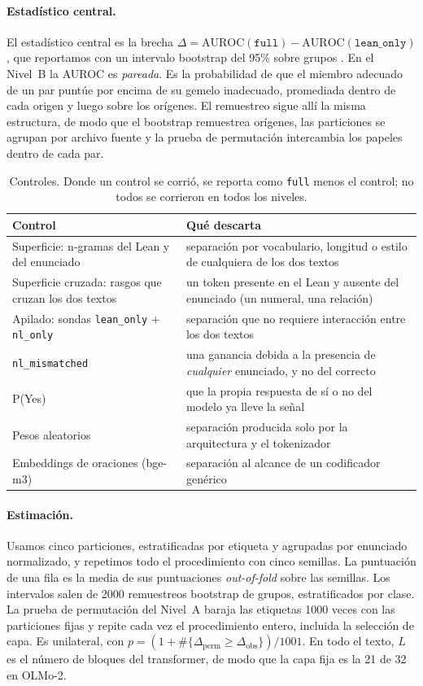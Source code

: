 \documentclass[10pt]{article}
\newcommand{\vr}[1]{\texttt{#1}}
\newcommand{\D}{\Delta}
\begin{document}
\paragraph{Estadístico central.}
El estadístico central es la brecha
$\D = \mathrm{AUROC}(\vr{full}) - \mathrm{AUROC}(\vr{lean\_only})$, que reportamos con un intervalo bootstrap del 95\% sobre grupos \citep{efron}.
En el Nivel~B la AUROC es \emph{pareada}. Es la probabilidad de que el miembro adecuado de un par puntúe por encima
de su gemelo inadecuado, promediada dentro de cada origen y luego sobre los orígenes. El remuestreo sigue allí la
misma estructura, de modo que el bootstrap remuestrea orígenes, las particiones se agrupan por archivo fuente y la
prueba de permutación intercambia los papeles dentro de cada par.

\begin{table}[h]
\centering
\caption{Controles. Donde un control se corrió, se reporta como \vr{full} menos el control; no todos se corrieron en todos los niveles.}
\label{tab:controles}
\vspace{2pt}
\begin{tabularx}{\linewidth}{@{}lX@{}}
\toprule
Control & Qué descarta\\
\midrule
Superficie: n-gramas del Lean y del enunciado & separación por vocabulario, longitud o estilo de cualquiera de los dos textos\\
Superficie cruzada: rasgos que cruzan los dos textos & un token presente en el Lean y ausente del enunciado (un numeral, una relación)\\
Apilado: sondas \vr{lean\_only} + \vr{nl\_only} & separación que no requiere interacción entre los dos textos\\
\vr{nl\_mismatched} & una ganancia debida a la presencia de \emph{cualquier} enunciado, y no del correcto\\
P(Yes) & que la propia respuesta de sí o no del modelo ya lleve la señal\\
Pesos aleatorios & separación producida solo por la arquitectura y el tokenizador\\
Embeddings de oraciones (bge-m3) & separación al alcance de un codificador genérico\\
\bottomrule
\end{tabularx}
\end{table}

\paragraph{Estimación.}
Usamos cinco particiones, estratificadas por etiqueta y agrupadas por enunciado normalizado, y repetimos todo el
procedimiento con cinco semillas. La puntuación de una fila es la media de sus puntuaciones \emph{out-of-fold}
sobre las semillas. Los intervalos salen de 2000 remuestreos bootstrap de grupos, estratificados por clase. La
prueba de permutación del Nivel~A baraja las etiquetas 1000 veces con las particiones fijas y repite cada vez el
procedimiento entero, incluida la selección de capa. Es unilateral, con
$p = (1 + \#\{\D_{\mathrm{perm}} \ge \D_{\mathrm{obs}}\})/1001$. En todo el texto, $L$ es el número de bloques del
transformer, de modo que la capa fija es la 21 de 32 en OLMo-2.
\end{document}
